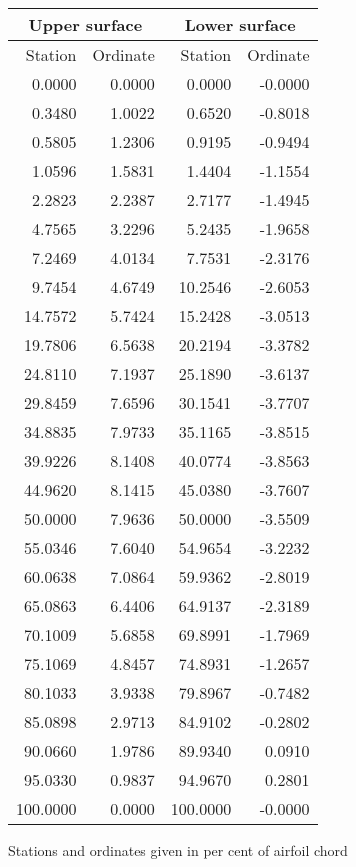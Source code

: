 \documentclass[11pt]{book}
\begin{document}
 \hspace{4mm}
 \begin{tabular}{|r|r|r|r|} \hline 
 \multicolumn{2}{|c|}{Upper surface} & \multicolumn{2}{|c|}{Lower surface} \\
 \hline
 Station & Ordinate & Station & Ordinate \\
 \hline
0.0000 & 0.0000 & 0.0000 & -0.0000 \\
0.3480 & 1.0022 & 0.6520 & -0.8018 \\
0.5805 & 1.2306 & 0.9195 & -0.9494 \\
1.0596 & 1.5831 & 1.4404 & -1.1554 \\
2.2823 & 2.2387 & 2.7177 & -1.4945 \\
4.7565 & 3.2296 & 5.2435 & -1.9658 \\
7.2469 & 4.0134 & 7.7531 & -2.3176 \\
9.7454 & 4.6749 & 10.2546 & -2.6053 \\
14.7572 & 5.7424 & 15.2428 & -3.0513 \\
19.7806 & 6.5638 & 20.2194 & -3.3782 \\
24.8110 & 7.1937 & 25.1890 & -3.6137 \\
29.8459 & 7.6596 & 30.1541 & -3.7707 \\
34.8835 & 7.9733 & 35.1165 & -3.8515 \\
39.9226 & 8.1408 & 40.0774 & -3.8563 \\
44.9620 & 8.1415 & 45.0380 & -3.7607 \\
50.0000 & 7.9636 & 50.0000 & -3.5509 \\
55.0346 & 7.6040 & 54.9654 & -3.2232 \\
60.0638 & 7.0864 & 59.9362 & -2.8019 \\
65.0863 & 6.4406 & 64.9137 & -2.3189 \\
70.1009 & 5.6858 & 69.8991 & -1.7969 \\
75.1069 & 4.8457 & 74.8931 & -1.2657 \\
80.1033 & 3.9338 & 79.8967 & -0.7482 \\
85.0898 & 2.9713 & 84.9102 & -0.2802 \\
90.0660 & 1.9786 & 89.9340 & 0.0910 \\
95.0330 & 0.9837 & 94.9670 & 0.2801 \\
100.0000 & 0.0000 & 100.0000 & -0.0000 \\
 \hline 
 \end{tabular}
 \vspace{8mm}

Stations and ordinates given in per cent of airfoil chord
\end{document}
